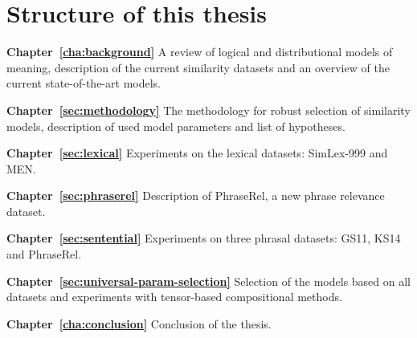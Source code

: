 \section{Structure of this thesis}
\label{sec:structure}

\textbf{Chapter~\ref{cha:background}} A review of logical and distributional models of meaning, description of the current similarity datasets and an overview of the current state-of-the-art models.

\textbf{Chapter~\ref{sec:methodology}} The methodology for robust selection of similarity models, description of used model parameters and list of hypotheses.

\textbf{Chapter~\ref{sec:lexical}} Experiments on the lexical datasets: SimLex-999 and MEN.

\textbf{Chapter~\ref{sec:phraserel}} Description of PhraseRel, a new phrase relevance dataset.

\textbf{Chapter~\ref{sec:sentential}} Experiments on three phrasal datasets: GS11, KS14 and PhraseRel.

\textbf{Chapter~\ref{sec:universal-param-selection}} Selection of the models based on all datasets and experiments with tensor-based compositional methods.

\textbf{Chapter~\ref{cha:conclusion}} Conclusion of the thesis.

